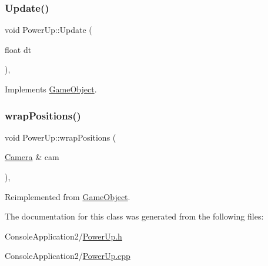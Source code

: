 \hypertarget{class_power_up_ab5d07a771930ebeadb6b8b0567436560}{}\label{class_power_up_ab5d07a771930ebeadb6b8b0567436560} 
\subsubsection{\texorpdfstring{Update()}{Update()}}
{\footnotesize\ttfamily void Power\+Up\+::\+Update (\begin{DoxyParamCaption}\item[{float}]{dt }\end{DoxyParamCaption})\hspace{0.3cm}{\ttfamily [override]}, {\ttfamily [virtual]}}



Implements \hyperlink{class_game_object_a93ed63df640deb516a020530e7f8e045}{Game\+Object}.

\hypertarget{class_power_up_ad9ec62c1a3832e17949044c8349d0afb}{}\label{class_power_up_ad9ec62c1a3832e17949044c8349d0afb} 
\subsubsection{\texorpdfstring{wrap\+Positions()}{wrapPositions()}}
{\footnotesize\ttfamily void Power\+Up\+::wrap\+Positions (\begin{DoxyParamCaption}\item[{\hyperlink{class_camera}{Camera} \&}]{cam }\end{DoxyParamCaption})\hspace{0.3cm}{\ttfamily [override]}, {\ttfamily [virtual]}}



Reimplemented from \hyperlink{class_game_object_a53b129d55688652e25e6515d80e669ca}{Game\+Object}.



The documentation for this class was generated from the following files\+:\begin{DoxyCompactItemize}
\item 
Console\+Application2/\hyperlink{_power_up_8h}{Power\+Up.\+h}\item 
Console\+Application2/\hyperlink{_power_up_8cpp}{Power\+Up.\+cpp}\end{DoxyCompactItemize}
